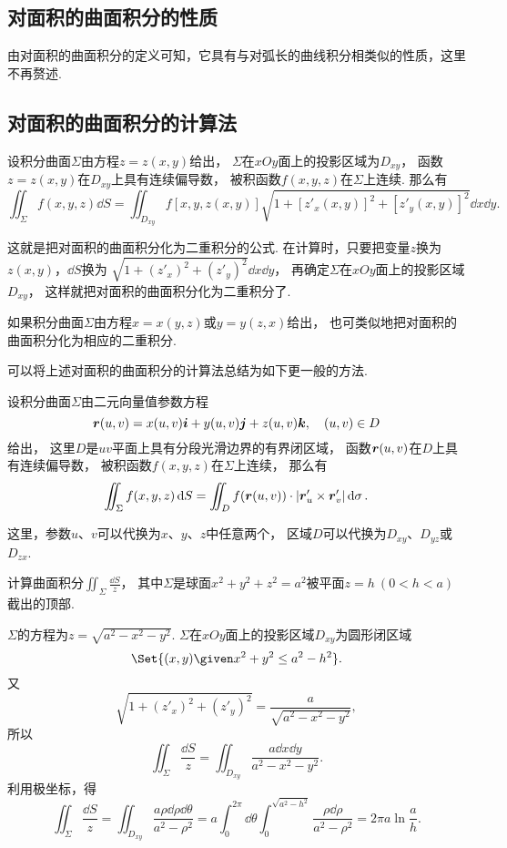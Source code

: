 \subsection{对面积的曲面积分的性质}
由对面积的曲面积分的定义可知，它具有与对弧长的曲线积分相类似的性质，这里不再赘述.

\subsection{对面积的曲面积分的计算法}
\begin{theorem}
设积分曲面\(\Sigma\)由方程\(z=z(x,y)\)给出，
\(\Sigma\)在\(xOy\)面上的投影区域为\(D_{xy}\)，
函数\(z=z(x,y)\)在\(D_{xy}\)上具有连续偏导数，
被积函数\(f(x,y,z)\)在\(\Sigma\)上连续.
那么有\begin{equation}\label{equation:线积分与面积分.第一类曲面积分的计算式1}
	\iint_\Sigma f(x,y,z) \dd{S}
	= \iint_{D_{xy}} f[x,y,z(x,y)] \sqrt{1+[z'_x(x,y)]^2+[z'_y(x,y)]^2} \dd{x}\dd{y}.
\end{equation}
\end{theorem}
这就是把对面积的曲面积分化为二重积分的公式.
在计算时，只要把变量\(z\)换为\(z(x,y)\)，\(\dd{S}\)换为
\(\sqrt{1+(z'_x)^2+(z'_y)^2} \dd{x}\dd{y}\)，
再确定\(\Sigma\)在\(xOy\)面上的投影区域\(D_{xy}\)，
这样就把对面积的曲面积分化为二重积分了.

如果积分曲面\(\Sigma\)由方程\(x=x(y,z)\)或\(y=y(z,x)\)给出，
也可类似地把对面积的曲面积分化为相应的二重积分.

可以将上述对面积的曲面积分的计算法总结为如下更一般的方法.
\begin{theorem}
设积分曲面\(\Sigma\)由二元向量值参数方程\[
	\boldsymbol{r}(u,v) = x(u,v) \boldsymbol{i} + y(u,v) \boldsymbol{j} + z(u,v) \boldsymbol{k},
	\quad (u,v) \in D
\]给出，
这里\(D\)是\(uv\)平面上具有分段光滑边界的有界闭区域，
函数\(\boldsymbol{r}(u,v)\)在\(D\)上具有连续偏导数，
被积函数\(f(x,y,z)\)在\(\Sigma\)上连续，
那么有\[
	\iint_\Sigma f(x,y,z) \dd{S}
	= \iint_D f(\boldsymbol{r}(u,v)) \cdot \abs{\boldsymbol{r}'_u \times \boldsymbol{r}'_v} \dd{\sigma}.
\]
\end{theorem}
这里，参数\(u\)、\(v\)可以代换为\(x\)、\(y\)、\(z\)中任意两个，
区域\(D\)可以代换为\(D_{xy}\)、\(D_{yz}\)或\(D_{zx}\).

\begin{example}
计算曲面积分\(\iint_\Sigma \frac{\dd{S}}{z}\)，
其中\(\Sigma\)是球面\(x^2+y^2+z^2=a^2\)被平面\(z = h\ (0<h<a)\)截出的顶部.
\begin{solution}
\(\Sigma\)的方程为\(z = \sqrt{a^2-x^2-y^2}\).
\(\Sigma\)在\(xOy\)面上的投影区域\(D_{xy}\)为圆形闭区域\[
	\Set{(x,y) \given x^2+y^2 \leq a^2-h^2}.
\]
又\[
	\sqrt{1+(z'_x)^2+(z'_y)^2} = \frac{a}{\sqrt{a^2-x^2-y^2}},
\]
所以\[
	\iint_\Sigma \frac{\dd{S}}{z}
	= \iint_{D_{xy}} \frac{a\dd{x}\dd{y}}{a^2-x^2-y^2}.
\]
利用极坐标，得\[
	\iint_\Sigma \frac{\dd{S}}{z}
	= \iint_{D_{xy}} \frac{a\rho\dd{\rho}\dd{\theta}}{a^2-\rho^2}
	= a \int_0^{2\pi} \dd{\theta} \int_0^{\sqrt{a^2-h^2}} \frac{\rho\dd{\rho}}{a^2-\rho^2}
	= 2\pi a \ln\frac{a}{h}.
\]
\end{solution}
\end{example}


